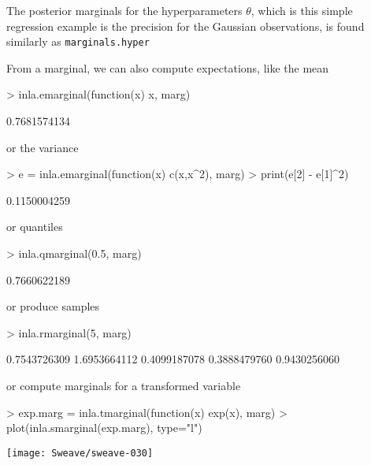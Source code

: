 \documentclass[a4paper,11pt]{report}
\begin{document}
The posterior marginals for the hyperparameters $\theta$, which is
this simple regression example is the precision for the Gaussian
observations, is found similarly as
\verb|marginals.hyper|
\begin{Schunk}
\end{Schunk}

From a marginal, we can also compute expectations, like the mean
\begin{Schunk}
\begin{Sinput}
> inla.emarginal(function(x) x, marg)
\end{Sinput}
\begin{Soutput}
[1] 0.7681574134
\end{Soutput}
\end{Schunk}
or the variance
\begin{Schunk}
\begin{Sinput}
> e = inla.emarginal(function(x) c(x,x^2), marg)
> print(e[2] - e[1]^2)
\end{Sinput}
\begin{Soutput}
[1] 0.1150004259
\end{Soutput}
\end{Schunk}
or quantiles
\begin{Schunk}
\begin{Sinput}
> inla.qmarginal(0.5, marg)
\end{Sinput}
\begin{Soutput}
[1] 0.7660622189
\end{Soutput}
\end{Schunk}
or produce samples
\begin{Schunk}
\begin{Sinput}
> inla.rmarginal(5, marg)
\end{Sinput}
\begin{Soutput}
[1] 0.7543726309 1.6953664112 0.4099187078 0.3888479760 0.9430256060
\end{Soutput}
\end{Schunk}
or compute marginals for a transformed variable
\begin{Schunk}
\begin{Sinput}
> exp.marg = inla.tmarginal(function(x) exp(x), marg)
> plot(inla.smarginal(exp.marg), type="l")
\end{Sinput}
\end{Schunk}
\texttt{[image: Sweave/sweave-030]}
\end{document}
